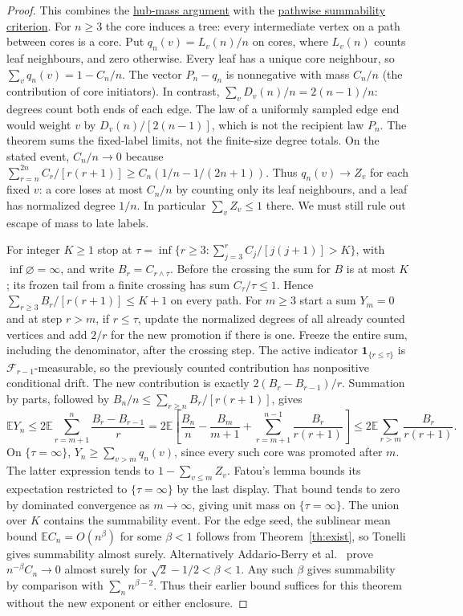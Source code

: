 \documentclass[11pt]{article}
\newcommand{\proofsrc}[2]{\href{https://github.com/uzay-eth/friend-tree-exponent/blob/a0972085ad72ad5685ae7b424988648d1965e73c/#1}{#2}}
\theoremstyle{remark}
\numberwithin{equation}{section}
\newcommand{\E}{\mathbb E}
\begin{document}
\begin{proof}
This combines the \proofsrc{round2/proofs/astra/source/round2/standalone/claim-7.md}{hub-mass argument} with the \proofsrc{round2/proofs/neon2/claim14-proofs/README.md}{pathwise summability criterion}. For $n\ge3$ the core induces a tree: every intermediate vertex on a path between cores is a core. Put $q_n(v)=L_v(n)/n$ on cores, where $L_v(n)$ counts leaf neighbours, and zero otherwise. Every leaf has a unique core neighbour, so $\sum_v q_n(v)=1-C_n/n$. The vector $P_n-q_n$ is nonnegative with mass $C_n/n$ (the contribution of core initiators). In contrast, $\sum_v D_v(n)/n=2(n-1)/n$: degrees count both ends of each edge. The law of a uniformly sampled edge end would weight $v$ by $D_v(n)/[2(n-1)]$, which is not the recipient law $P_n$. The theorem sums the fixed-label limits, not the finite-size degree totals. On the stated event, $C_n/n\to0$ because $\sum_{r=n}^{2n} C_r/[r(r+1)]\ge C_n(1/n-1/(2n+1))$. Thus $q_n(v)\to Z_v$ for each fixed $v$: a core loses at most $C_n/n$ by counting only its leaf neighbours, and a leaf has normalized degree $1/n$. In particular $\sum_v Z_v\le1$ there. We must still rule out escape of mass to late labels.

For integer $K\ge1$ stop at $\tau=\inf\{r\ge3:\sum_{j=3}^r C_j/[j(j+1)]>K\}$, with $\inf\varnothing=\infty$, and write $B_r=C_{r\wedge\tau}$. Before the crossing the sum for $B$ is at most $K$; its frozen tail from a finite crossing has sum $C_\tau/\tau\le1$. Hence $\sum_{r\ge3} B_r/[r(r+1)]\le K+1$ on every path. For $m\ge3$ start a sum $Y_m=0$ and at step $r>m$, if $r\le\tau$, update the normalized degrees of all already counted vertices and add $2/r$ for the new promotion if there is one. Freeze the entire sum, including the denominator, after the crossing step. The active indicator $\mathbf1_{\{r\le\tau\}}$ is $\mathcal F_{r-1}$-measurable, so the previously counted contribution has nonpositive conditional drift. The new contribution is exactly $2(B_r-B_{r-1})/r$. Summation by parts, followed by $B_n/n\le\sum_{r\ge n}B_r/[r(r+1)]$, gives
\[
 \E Y_n\le 2\E\sum_{r=m+1}^n\frac{B_r-B_{r-1}}r
 =2\E\left[\frac{B_n}n-\frac{B_m}{m+1}+\sum_{r=m+1}^{n-1}\frac{B_r}{r(r+1)}\right]
 \le 2\E\sum_{r>m}\frac{B_r}{r(r+1)}.
\]
On $\{\tau=\infty\}$, $Y_n\ge\sum_{v>m}q_n(v)$, since every such core was promoted after $m$. The latter expression tends to $1-\sum_{v\le m}Z_v$. Fatou's lemma bounds its expectation restricted to $\{\tau=\infty\}$ by the last display. That bound tends to zero by dominated convergence as $m\to\infty$, giving unit mass on $\{\tau=\infty\}$. The union over $K$ contains the summability event. For the edge seed, the sublinear mean bound $\E C_n=O(n^\beta)$ for some $\beta<1$ follows from Theorem~\ref{th:exist}, so Tonelli gives summability almost surely. Alternatively Addario-Berry et al.\ \cite[Prop.~6.22]{AB} prove $n^{-\beta}C_n\to0$ almost surely for $\sqrt{2}-1/2<\beta<1$. Any such $\beta$ gives summability by comparison with $\sum_n n^{\beta-2}$. Thus their earlier bound suffices for this theorem without the new exponent or either enclosure.


\end{proof}
\end{document}
